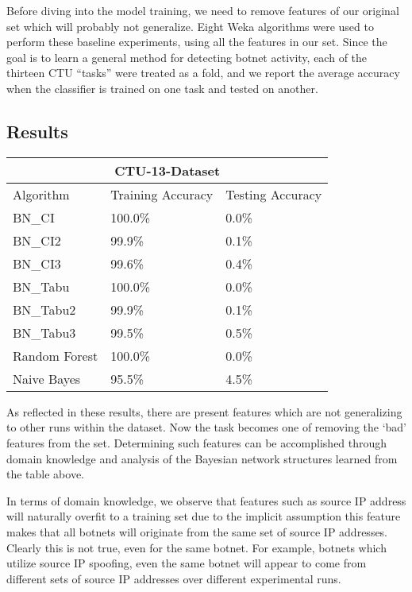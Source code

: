 \documentclass[letterpaper]{article}
\begin{document}
Before diving into the model training, we need to remove features of our original set which will probably not generalize.  Eight Weka \cite{witten2016data} algorithms were used to perform these baseline experiments, using all the features in our set. Since the goal is to learn a general method for detecting botnet activity, each of the thirteen CTU ``tasks'' were treated as a fold, and we report the average accuracy when the classifier is trained on one task and tested on another.

\subsection{Results}

\begin{tabular}{ |p{2.3cm}|p{1.9cm}|p{1.9cm}|  }
\hline
\multicolumn{3}{|c|}{CTU-13-Dataset} \\
\hline
Algorithm & Training Accuracy & Testing Accuracy \\
\hline
BN\_CI & 100.0\% & 0.0\% \\
BN\_CI2 & 99.9\% & 0.1\% \\
BN\_CI3 & 99.6\% & 0.4\% \\
BN\_Tabu & 100.0\% & 0.0\% \\
BN\_Tabu2 & 99.9\% & 0.1\% \\
BN\_Tabu3 & 99.5\% & 0.5\% \\
Random Forest & 100.0\% & 0.0\% \\
Naive Bayes & 95.5\% & 4.5\% \\
\hline
\end{tabular}

As reflected in these results, there are present features which are not generalizing to other runs within the dataset.  Now the task becomes one of removing the `bad' features from the set.  Determining such features can be accomplished through domain knowledge and analysis of the Bayesian network structures learned from the table above.

In terms of domain knowledge, we observe that features such as source IP address will naturally overfit to a training set due to the implicit assumption this feature makes that all botnets will originate from the same set of source IP addresses.  Clearly this is not true, even for the same botnet.  For example, botnets which utilize source IP spoofing, even the same botnet will appear to come from different sets of source IP addresses over different experimental runs.
\end{document}
